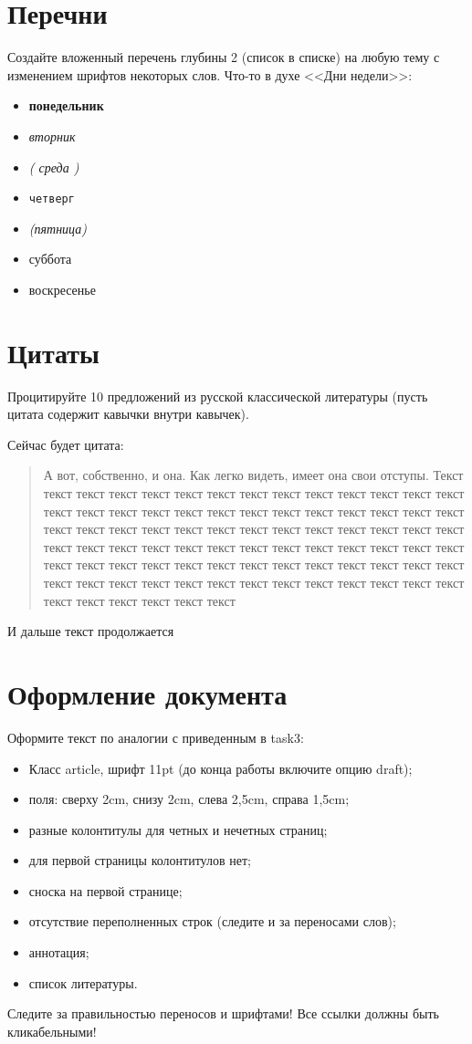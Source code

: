 \documentclass[a4paper,12pt]{article} %
\begin{document}

\section{Перечни}
Создайте вложенный перечень глубины 2 (список в списке) на любую тему с изменением шрифтов некоторых слов.
Что-то в духе <<Дни недели>>:
\begin{itemize}
	\item {\bf понедельник}
	\item {\it вторник}
	\item \textit{\textup{(} среда \textup{)}}
	\item \texttt{четверг}
	\item \textit{(пятница) }
	\item суббота
	\item воскресенье
\end{itemize}

\section{Цитаты}
Процитируйте 10 предложений из русской классической литературы (пусть цитата содержит кавычки внутри кавычек).

Сейчас будет цитата:
\begin{quote}
	А вот, собственно, и она. Как легко видеть, имеет она свои отступы. Текст текст текст текст текст текст текст текст текст текст текст текст текст текст текст текст текст текст текст текст текст текст текст текст текст текст текст текст текст текст текст текст текст текст текст текст текст текст текст текст текст текст текст текст текст текст текст текст текст текст текст текст текст текст текст текст текст текст текст текст текст текст текст текст текст текст текст текст текст текст текст текст текст текст текст текст текст текст текст текст текст текст текст текст текст
\end{quote}
И дальше текст продолжается

\section{Оформление документа}
Оформите текст по аналогии с приведенным в task3:
\begin{itemize}
	\item Класс article, шрифт 11pt (до конца работы включите опцию draft);
	\item поля: сверху 2cm, снизу 2cm, слева 2,5cm, справа 1,5cm;
	\item разные колонтитулы для четных и нечетных страниц;
	\item для первой страницы колонтитулов нет;
	\item сноска на первой странице;
	\item отсутствие переполненных строк (следите и за переносами слов);
	\item аннотация;
	\item список литературы.
\end{itemize}
Следите за правильностью переносов и шрифтами! Все ссылки должны быть кликабельными!
\end{document}
